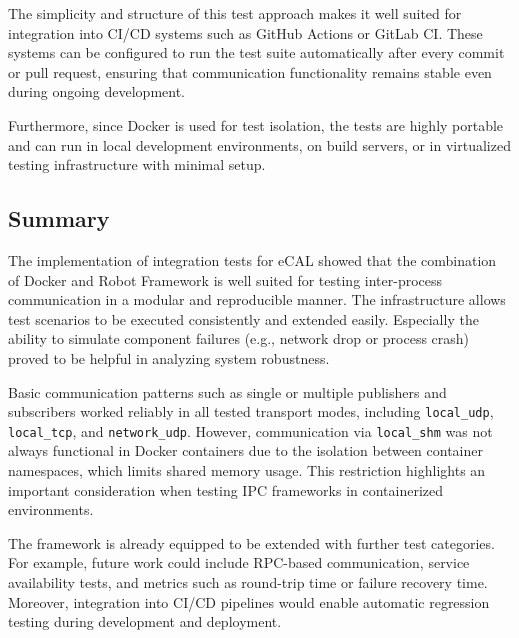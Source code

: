 \vspace{0.5em}
The simplicity and structure of this test approach makes it well suited for integration into CI/CD systems such as GitHub Actions or GitLab CI. These systems can be configured to run the test suite automatically after every commit or pull request, ensuring that communication functionality remains stable even during ongoing development.

\vspace{0.9em}
Furthermore, since Docker is used for test isolation, the tests are highly portable and can run in local development environments, on build servers, or in virtualized testing infrastructure with minimal setup.

\subsection{Summary}

The implementation of integration tests for eCAL showed that the combination of Docker and Robot Framework is well suited for testing inter-process communication in a modular and reproducible manner. The infrastructure allows test scenarios to be executed consistently and extended easily. Especially the ability to simulate component failures (e.g., network drop or process crash) proved to be helpful in analyzing system robustness.

\vspace{0.9em}
Basic communication patterns such as single or multiple publishers and subscribers worked reliably in all tested transport modes, including \texttt{local\_udp}, \texttt{local\_tcp}, and \texttt{network\_udp}. However, communication via \texttt{local\_shm} was not always functional in Docker containers due to the isolation between container namespaces, which limits shared memory usage. This restriction highlights an important consideration when testing IPC frameworks in containerized environments.

\vspace{0.9em}
The framework is already equipped to be extended with further test categories. For example, future work could include RPC-based communication, service availability tests, and metrics such as round-trip time or failure recovery time. Moreover, integration into CI/CD pipelines would enable automatic regression testing during development and deployment.

